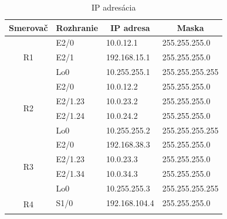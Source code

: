 \documentclass[12pt,twoside,a4paper]{report}
\begin{document}
\begin{table}[!htbp]
\centering
\caption{IP adresácia}
\label{tab:ip_adresacia}
\begin{tabular}{|c|l|l|l|}
\hline
\textbf{Smerovač}    & \multicolumn{1}{c|}{\textbf{Rozhranie}} & \multicolumn{1}{c|}{\textbf{IP adresa}} & \multicolumn{1}{c|}{\textbf{Maska}} \\ \hline
\multirow{3}{*}{R1}  & E2/0                                    & 10.0.12.1                               & 255.255.255.0                       \\ \cline{2-4} 
                     & E2/1                                    & 192.168.15.1                            & 255.255.255.0                       \\ \cline{2-4} 
                     & Lo0                                     & 10.255.255.1                            & 255.255.255.255                     \\ \hline
\multirow{4}{*}{R2}  & E2/0                                    & 10.0.12.2                               & 255.255.255.0                       \\ \cline{2-4} 
                     & E2/1.23                                 & 10.0.23.2                               & 255.255.255.0                       \\ \cline{2-4} 
                     & E2/1.24                                 & 10.0.24.2                               & 255.255.255.0                       \\ \cline{2-4} 
                     & Lo0                                     & 10.255.255.2                            & 255.255.255.255                     \\ \hline
\multirow{4}{*}{R3}  & E2/0                                    & 192.168.38.3                            & 255.255.255.0                       \\ \cline{2-4} 
                     & E2/1.23                                 & 10.0.23.3                               & 255.255.255.0                       \\ \cline{2-4} 
                     & E2/1.34                                 & 10.0.34.3                               & 255.255.255.0                       \\ \cline{2-4} 
                     & Lo0                                     & 10.255.255.3                            & 255.255.255.255                     \\ \hline
\multirow{5}{*}{R4}  & S1/0                                    & 192.168.104.4                           & 255.255.255.0                       \\ \cline{2-4} 

\end{tabular}
\end{table}
\end{document}
